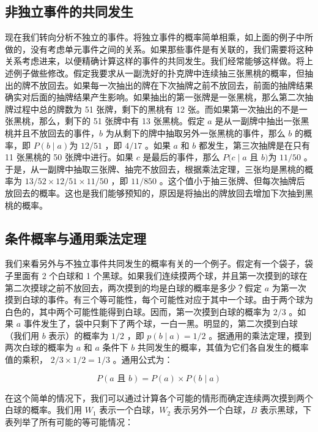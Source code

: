 \subsection{非独立事件的共同发生}

现在我们转向分析不独立的事件。将独立事件的概率简单相乘，如上面的例子中所做的，没有考虑单元事件之间的关系。如果那些事件是有关联的，我们需要将这种关系考虑进来，以便精确计算这样的事件的共同发生。我们经常能够这样做。将上述例子做些修改。假定我要求从一副洗好的扑克牌中连续抽三张黑桃的概率，但抽出的牌不放回去。如果每一次抽出的牌在下次抽牌之前不放回去，前面的抽牌结果确实对后面的抽牌结果产生影响。如果抽出的第一张牌是一张黑桃，那么第二次抽牌过程中总的牌数为 51 张牌，剩下的黑桃有 12 张。而如果第一次抽出的不是一张黑桃，那么，剩下的 51 张牌中有 13 张黑桃。假定 $a$ 是从一副牌中抽出一张黑桃并且不放回去的事件，$b$ 为从剩下的牌中抽取另外一张黑桃的事件，那么 $b$ 的概率，即 $P(b \mid a)$为 $12 / 51$ ，即 $4 / 17$ 。如果 $a$ 和 $b$ 都发生，第三次抽牌是在只有 11 张黑桃的 50 张牌中进行。如果 $c$ 是最后的事件，那么 $P(c \mid a$ 且 $b)$为 $11 / 50$ 。于是，从一副牌中抽取三张牌、抽完不放回去，根据乘法定理，三张均是黑桃的概率为 $13 / 52 \times 12 / 51 \times 11 / 50$ ，即 $11 / 850$ 。这个值小于抽三张牌、但每次抽牌后放回去的概率。这也是我们能够预知的，原因是将抽出的牌放回去增加下次抽到黑桃的概率。

\subsection{条件概率与通用乘法定理}

我们来看另外与不独立事件共同发生的概率有关的一个例子。假定有一个袋子，袋子里面有 2 个白球和 1 个黑球。如果我们连续摸两个球，并且第一次摸到的球在第二次摸球之前不放回去，两次摸到的均是白球的概率是多少？假定 $a$ 为第一次摸到白球的事件。有三个等可能性，每个可能性对应于其中一个球。由于两个球为白色的，其中两个可能性能得到白球。因而，第一次摸到白球的概率为 $2 / 3$ 。如果 $a$ 事件发生了，袋中只剩下了两个球，一白一黑。明显的，第二次摸到白球（我们用 $b$ 表示）的概率为 $1 / 2$ ，即 $p(b \mid a)=1 / 2$ 。据通用的乘法定理，摸到两次白球的概率为 $a$ 和 $a$ 条件下 $b$ 共同发生的概率，其值为它们各自发生的概率值的乘积， $2 / 3 \times 1 / 2=1 / 3$ 。通用公式为：

$$
P(a \text { 且 } b)=P(a) \times P(b \mid a)
$$

在这个简单的情况下，我们可以通过计算各个可能的情形而确定连续两次摸到两个白球的概率。我们用 $W_{1}$ 表示一个白球，$W_{2}$ 表示另外一个白球，$B$ 表示黑球，下表列举了所有可能的等可能情况：

